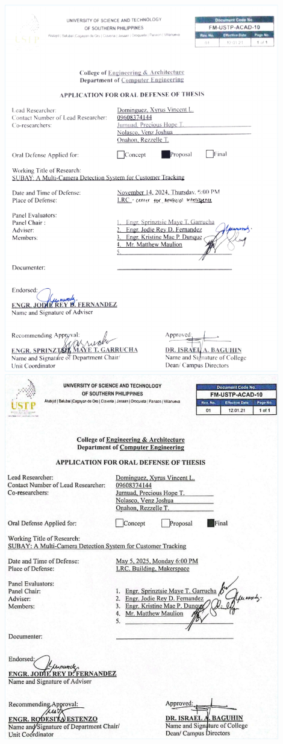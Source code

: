 \begin{center}
	\includegraphics[width=0.9\textwidth]{app/N.pdf}
	\includegraphics[width=0.9\textwidth]{app/O.pdf}
\end{center}

